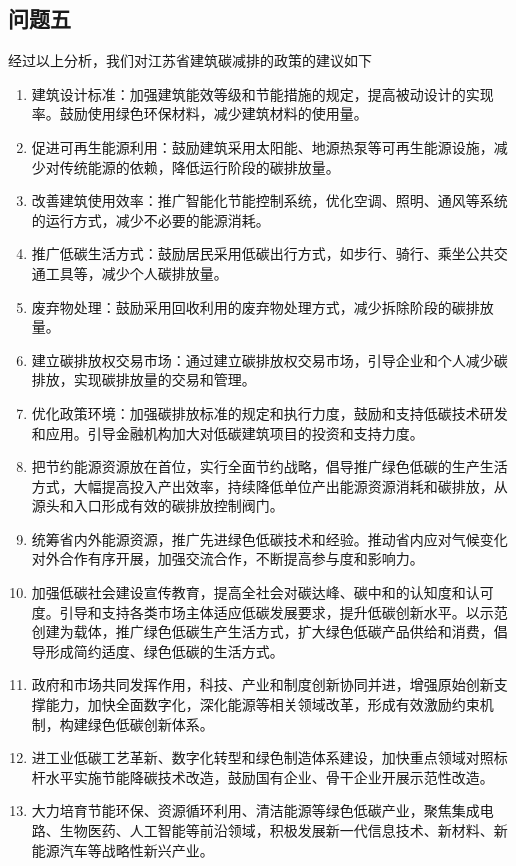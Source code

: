 \documentclass[a4paper, 12pt]{article}
\numberwithin{equation}{section}
\begin{document}
        \subsection{问题五}
            经过以上分析，我们对江苏省建筑碳减排的政策的建议如下
            \begin{enumerate}
                \item 建筑设计标准：加强建筑能效等级和节能措施的规定，提高被动设计的实现率。鼓励使用绿色环保材料，减少建筑材料的使用量。
                \item 促进可再生能源利用：鼓励建筑采用太阳能、地源热泵等可再生能源设施，减少对传统能源的依赖，降低运行阶段的碳排放量。
                \item 改善建筑使用效率：推广智能化节能控制系统，优化空调、照明、通风等系统的运行方式，减少不必要的能源消耗。
                \item 推广低碳生活方式：鼓励居民采用低碳出行方式，如步行、骑行、乘坐公共交通工具等，减少个人碳排放量。
                \item 废弃物处理：鼓励采用回收利用的废弃物处理方式，减少拆除阶段的碳排放量。
                \item 建立碳排放权交易市场：通过建立碳排放权交易市场，引导企业和个人减少碳排放，实现碳排放量的交易和管理。
                \item 优化政策环境：加强碳排放标准的规定和执行力度，鼓励和支持低碳技术研发和应用。引导金融机构加大对低碳建筑项目的投资和支持力度。
                \item 把节约能源资源放在首位，实行全面节约战略，倡导推广绿色低碳的生产生活方式，大幅提高投入产出效率，持续降低单位产出能源资源消耗和碳排放，从源头和入口形成有效的碳排放控制阀门。
                \item 统筹省内外能源资源，推广先进绿色低碳技术和经验。推动省内应对气候变化对外合作有序开展，加强交流合作，不断提高参与度和影响力。
                \item 加强低碳社会建设宣传教育，提高全社会对碳达峰、碳中和的认知度和认可度。引导和支持各类市场主体适应低碳发展要求，提升低碳创新水平。以示范创建为载体，推广绿色低碳生产生活方式，扩大绿色低碳产品供给和消费，倡导形成简约适度、绿色低碳的生活方式。
                \item 政府和市场共同发挥作用，科技、产业和制度创新协同并进，增强原始创新支撑能力，加快全面数字化，深化能源等相关领域改革，形成有效激励约束机制，构建绿色低碳创新体系。
                \item 进工业低碳工艺革新、数字化转型和绿色制造体系建设，加快重点领域对照标杆水平实施节能降碳技术改造，鼓励国有企业、骨干企业开展示范性改造。
                \item 大力培育节能环保、资源循环利用、清洁能源等绿色低碳产业，聚焦集成电路、生物医药、人工智能等前沿领域，积极发展新一代信息技术、新材料、新能源汽车等战略性新兴产业。
            \end{enumerate}
\end{document}
